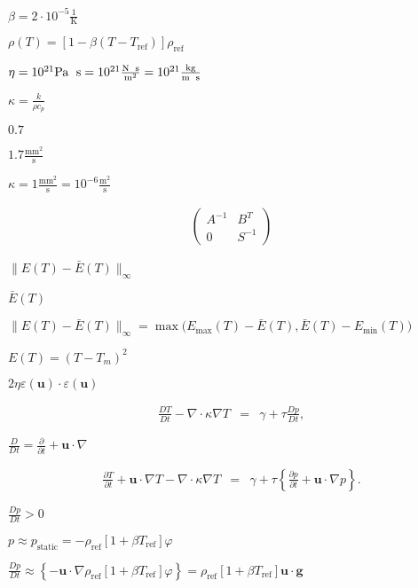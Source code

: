 \documentclass{article}
\begin{document}
$\beta=2\cdot 10^{-5} \frac 1{\text{K}}$
\pagebreak

$\rho(T)=[1-\beta(T-T_{\text{ref}})]\rho_{\text{ref}}$
\pagebreak

$\eta=10^{21} \text{Pa\; s} = 10^{21} \frac{\text{N\; s}}{\text{m}^2} = 10^{21} \frac{\text{kg}}{\text{m\; s}}$
\pagebreak

$\kappa=\frac{k}{\rho c_p}$
\pagebreak

$0.7$
\pagebreak

$1.7 \frac{\text{mm}^2}{\text{s}}$
\pagebreak

$\kappa=1 \frac{\text{mm}^2}{\text{s}} =10^{-6} \frac{\text{m}^2}{\text{s}}$
\pagebreak

\begin{align*} \left(\begin{array}{cc}A^{-1} & B^T \\0 & S^{-1} \end{array}\right) \end{align*}
\pagebreak

$\|E(T)-\bar{E}(T)\|_\infty$
\pagebreak

$\bar{E}(T)$
\pagebreak

$\|E(T)-\bar{E}(T)\|_\infty = \max\big(E_{\textrm{max}}(T)-\bar{E}(T), \bar{E}(T)-E_{\textrm{min}}(T)\big)$
\pagebreak

$E(T) = (T-T_m)^2$
\pagebreak

$2 \eta \varepsilon(\mathbf{u}) \cdot \varepsilon(\mathbf{u})$
\pagebreak

\begin{eqnarray*} \frac{D T}{Dt} - \nabla \cdot \kappa \nabla T &=& \gamma + \tau\frac{Dp}{Dt}, \end{eqnarray*}
\pagebreak

$\frac{D}{Dt} = \frac{\partial}{\partial t} + \mathbf u \cdot \nabla$
\pagebreak

\begin{eqnarray*} \frac{\partial T}{\partial t} + {\mathbf u} \cdot \nabla T - \nabla \cdot \kappa \nabla T &=& \gamma + \tau\left\{\frac{\partial p}{\partial t} + \mathbf u \cdot \nabla p \right\}. \end{eqnarray*}
\pagebreak

$\frac{Dp}{Dt}>0$
\pagebreak

$p\approx p_{\text{static}}=-\rho_{\text{ref}} [1+\beta T_{\text{ref}}] \varphi$
\pagebreak

$\frac{Dp}{Dt} \approx \left\{- \mathbf u \cdot \nabla \rho_{\text{ref}} [1+\beta T_{\text{ref}}]\varphi\right\} = \rho_{\text{ref}} [1+\beta T_{\text{ref}}] \mathbf u \cdot \mathbf g$
\pagebreak
\end{document}
